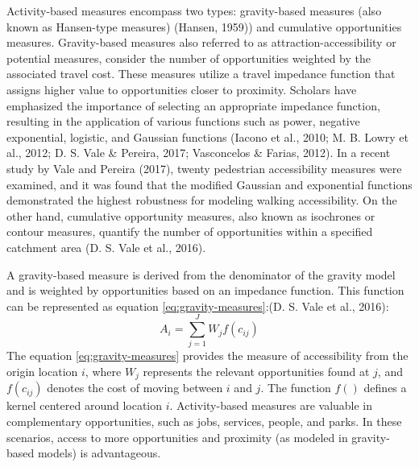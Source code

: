 \documentclass[12pt,twoside]{reedthesis}
\begin{document}
Activity-based measures encompass two types: gravity-based measures (also known as Hansen-type measures) (Hansen, 1959)) and cumulative opportunities measures. Gravity-based measures also referred to as attraction-accessibility or potential measures, consider the number of opportunities weighted by the associated travel cost. These measures utilize a travel impedance function that assigns higher value to opportunities closer to proximity. Scholars have emphasized the importance of selecting an appropriate impedance function, resulting in the application of various functions such as power, negative exponential, logistic, and Gaussian functions (Iacono et al., 2010; M. B. Lowry et al., 2012; D. S. Vale \& Pereira, 2017; Vasconcelos \& Farias, 2012). In a recent study by Vale and Pereira (2017), twenty pedestrian accessibility measures were examined, and it was found that the modified Gaussian and exponential functions demonstrated the highest robustness for modeling walking accessibility. On the other hand, cumulative opportunity measures, also known as isochrones or contour measures, quantify the number of opportunities within a specified catchment area (D. S. Vale et al., 2016).

A gravity-based measure is derived from the denominator of the gravity model and is weighted by opportunities based on an impedance function. This function can be represented as equation \eqref{eq:gravity-measures}:(D. S. Vale et al., 2016):
\begin{equation}
A_i = \sum_{j = 1}^{J} W_{j} f(c_{ij})
\label{eq:gravity-measures}
\end{equation}
The equation \eqref{eq:gravity-measures} provides the measure of accessibility from the origin location \(i\), where \(W_j\) represents the relevant opportunities found at \(j\), and \(f(c_{ij})\) denotes the cost of moving between \(i\) and \(j\). The function \(f()\) defines a kernel centered around location \(i\). Activity-based measures are valuable in complementary opportunities, such as jobs, services, people, and parks. In these scenarios, access to more opportunities and proximity (as modeled in gravity-based models) is advantageous.
\end{document}
